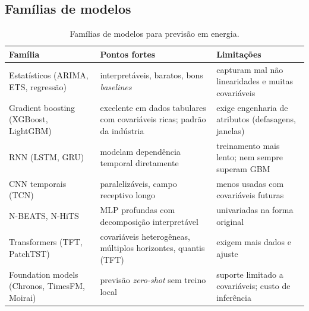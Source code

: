 \documentclass[10pt,a4paper,oneside]{article}
\begin{document}
\subsection{Famílias de modelos}

\begin{table}[h]
\small
\caption{Famílias de modelos para previsão em energia.}
\begin{tabelalarga}
\begin{tabularx}{\linewidth}{l L L}
\toprule
\textbf{Família} & \textbf{Pontos fortes} & \textbf{Limitações} \\
\midrule
Estatísticos (ARIMA, ETS, regressão) & interpretáveis, baratos, bons
  \textit{baselines} & capturam mal não linearidades e muitas covariáveis \\
Gradient boosting (XGBoost, LightGBM) & excelente em dados tabulares com
  covariáveis ricas; padrão da indústria & exige engenharia de atributos
  (defasagens, janelas) \\
RNN (LSTM, GRU) & modelam dependência temporal diretamente & treinamento
  mais lento; nem sempre superam GBM \\
CNN temporais (TCN) & paralelizáveis, campo receptivo longo & menos usadas
  com covariáveis futuras \\
N-BEATS, N-HiTS & MLP profundas com decomposição interpretável & univariadas
  na forma original \\
Transformers (TFT, PatchTST) & covariáveis heterogêneas, múltiplos
  horizontes, quantis (TFT)~\cite{tft} & exigem mais dados e ajuste \\
Foundation models (Chronos, TimesFM, Moirai) & previsão \textit{zero-shot}
  sem treino local~\cite{chronos,timesfm} & suporte limitado a covariáveis;
  custo de inferência \\
\bottomrule
\end{tabularx}
\end{tabelalarga}
\end{table}
\end{document}
